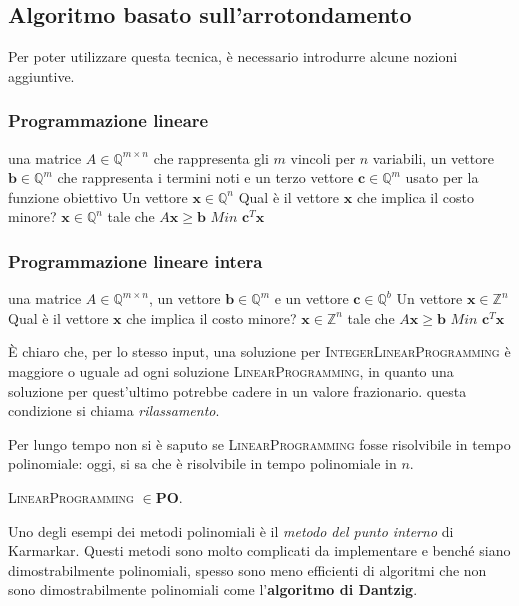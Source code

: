 \subsection{Algoritmo basato sull'arrotondamento}
Per poter utilizzare questa tecnica, è necessario introdurre alcune nozioni
aggiuntive.
\subsubsection{Programmazione lineare}
{una matrice $A \in \mathbb{Q}^{m \times n}$ che rappresenta gli $m$ vincoli
	per $n$ variabili, un vettore $\mathbf{b} \in \mathbb{Q}^{m}$ che rappresenta i
	termini noti e un terzo vettore $\mathbf{c} \in \mathbb{Q}^m$ usato per la
	funzione obiettivo}
{Un vettore $\mathbf{x} \in \mathbb{Q}^n$}
{Qual è il vettore $\mathbf{x}$ che implica il costo minore?}
{$\mathbf{x}\in \mathbb{Q}^{n}$ tale che $A \mathbf{x} \geq \mathbf{b}$}
{$Min$}
{ $\mathbf{c}^T \mathbf{x}$ }

\subsubsection{Programmazione lineare intera}
{una matrice $A \in \mathbb{Q}^{m \times n}$, un vettore $\mathbf{b} \in \mathbb{Q}^{m}$
	e un vettore $\mathbf{c} \in \mathbb{Q}^b$}
{Un vettore $\mathbf{x} \in \mathbb{Z}^n$}
{Qual è il vettore $\mathbf{x}$ che implica il costo minore?}
{$\mathbf{x}\in \mathbb{Z}^{n}$ tale che $A \mathbf{x} \geq \mathbf{b}$}
{$Min$}
{ $\mathbf{c}^T \mathbf{x}$ }

\`E chiaro che, per lo stesso input, una soluzione per \textsc{IntegerLinearProgramming}
è maggiore o uguale ad ogni soluzione \textsc{LinearProgramming}, in quanto una
soluzione per quest'ultimo potrebbe cadere in un valore frazionario.
questa condizione si chiama \textit{rilassamento}.

Per lungo tempo non si è saputo se \textsc{LinearProgramming} fosse risolvibile in tempo polinomiale:
oggi, si sa che è risolvibile in tempo polinomiale in $n$.
\begin{theorem}\label{thm:LinearProgramming_PO}
	\textsc{LinearProgramming} $\in \mathbf{PO}$.
\end{theorem}

Uno degli esempi dei metodi polinomiali è il \textit{metodo del punto interno}
di Karmarkar. Questi metodi sono molto complicati da implementare e benché siano
dimostrabilmente polinomiali, spesso sono meno efficienti di algoritmi che
non sono dimostrabilmente polinomiali come l'\textbf{algoritmo di Dantzig}.

